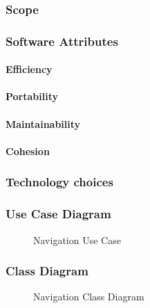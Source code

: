 \subsubsection{Scope}


\subsubsection{Software Attributes}

	\paragraph{Efficiency}
	\paragraph{Portability}
	\paragraph{Maintainability}
	\paragraph{Cohesion}


\subsubsection{Technology choices}

\subsubsection{Use Case Diagram}
	\begin{figure}[h!]
	\caption{Navigation Use Case}
	\end{figure}

\subsubsection{Class Diagram}
	\begin{figure}[h!]
	\caption{Navigation Class Diagram}
	\end{figure}

